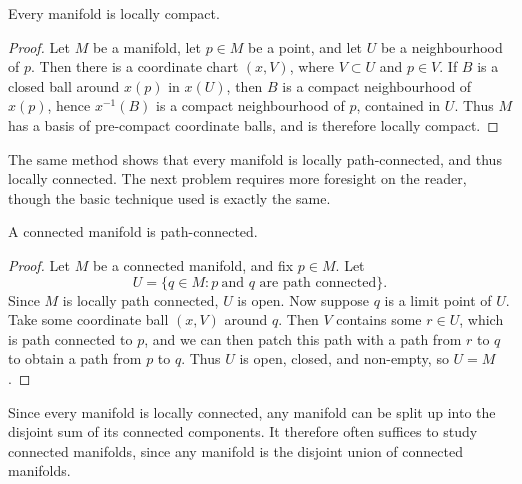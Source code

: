 \begin{theorem}
    Every manifold is locally compact.
\end{theorem}
\begin{proof}
    Let $M$ be a manifold, let $p \in M$ be a point, and let $U$ be a neighbourhood of $p$. Then there is a coordinate chart $(x,V)$, where $V \subset U$ and $p \in V$. If $B$ is a closed ball around $x(p)$ in $x(U)$, then $B$ is a compact neighbourhood of $x(p)$, hence $x^{-1}(B)$ is a compact neighbourhood of $p$, contained in $U$. Thus $M$ has a basis of pre-compact coordinate balls, and is therefore locally compact.
\end{proof}

The same method shows that every manifold is locally path-connected, and thus locally connected. The next problem requires more foresight on the reader, though the basic technique used is exactly the same.

\begin{theorem}
    A connected manifold is path-connected.
\end{theorem}
\begin{proof}
    Let $M$ be a connected manifold, and fix $p \in M$. Let
    \[ U = \{ q \in M: p\ \text{and $q$ are path connected} \}. \]
    Since $M$ is locally path connected, $U$ is open. Now suppose $q$ is a limit point of $U$. Take some coordinate ball $(x,V)$ around $q$. Then $V$ contains some $r \in U$, which is path connected to $p$, and we can then patch this path with a path from $r$ to $q$ to obtain a path from $p$ to $q$. Thus $U$ is open, closed, and non-empty, so $U = M$.
\end{proof}

Since every manifold is locally connected, any manifold can be split up into the disjoint sum of its connected components. It therefore often suffices to study connected manifolds, since any manifold is the disjoint union of connected manifolds.

